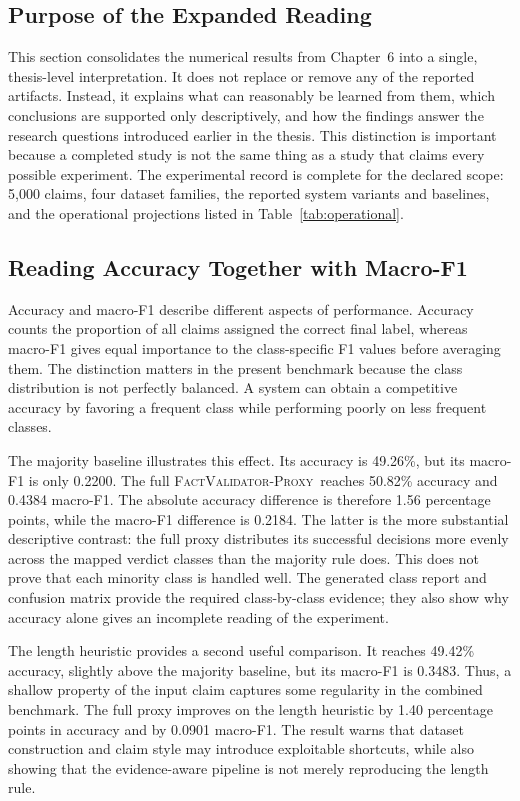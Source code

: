\documentclass[12pt,a4paper,openany]{report}
\newcommand{\proxy}{\textsc{FactValidator-Proxy}}
\begin{document}
\subsection{Purpose of the Expanded Reading}
This section consolidates the numerical results from Chapter~6 into a
single, thesis-level interpretation. It does not replace or remove any of the
reported artifacts. Instead, it explains what can reasonably be learned
from them, which conclusions are supported only descriptively, and how the
findings answer the research questions introduced earlier in the thesis. This
distinction is important because a completed study is not the same thing as a
study that claims every possible experiment. The experimental record is
complete for the declared scope: 5{,}000 claims, four dataset families, the
reported system variants and baselines, and the operational projections
listed in Table~\ref{tab:operational}.

\subsection{Reading Accuracy Together with Macro-F1}
Accuracy and macro-F1 describe different aspects of performance. Accuracy
counts the proportion of all claims assigned the correct final label, whereas
macro-F1 gives equal importance to the class-specific F1 values before
averaging them. The distinction matters in the present benchmark because the
class distribution is not perfectly balanced. A system can obtain a
competitive accuracy by favoring a frequent class while performing poorly on
less frequent classes.

The majority baseline illustrates this effect. Its accuracy is 49.26\%, but
its macro-F1 is only 0.2200. The full \proxy\ reaches 50.82\%
accuracy and 0.4384 macro-F1. The absolute accuracy difference is therefore
1.56 percentage points, while the macro-F1 difference is 0.2184. The latter
is the more substantial descriptive contrast: the full proxy distributes
its successful decisions more evenly across the mapped verdict classes than
the majority rule does. This does not prove that each minority class is
handled well. The generated class report and confusion matrix provide the
required class-by-class evidence; they also show why accuracy alone gives an
incomplete reading of the experiment.

The length heuristic provides a second useful comparison. It reaches 49.42\%
accuracy, slightly above the majority baseline, but its macro-F1 is 0.3483.
Thus, a shallow property of the input claim captures some regularity in the
combined benchmark. The full proxy improves on the length heuristic by
1.40 percentage points in accuracy and by 0.0901 macro-F1. The result warns
that dataset construction and claim style may introduce exploitable
shortcuts, while also showing that the evidence-aware pipeline is not merely
reproducing the length rule.
\end{document}
